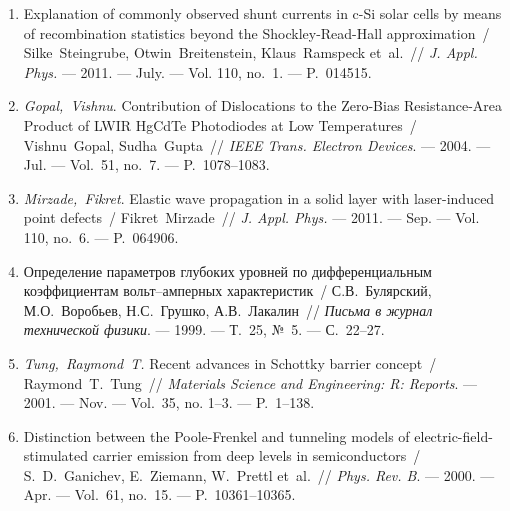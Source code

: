 \begin{center}
\textbf{\MakeUppercase{\fullbibtitle}}
\end{center}

\begin{enumerate}[label=\arabic*$^*$.,leftmargin=0em,itemindent=3em]
\item
Explanation of commonly observed shunt currents in c-Si solar cells by means of
  recombination statistics beyond the Shockley-Read-Hall approximation~/
  Silke~Steingrube, Otwin~Breitenstein, Klaus~Ramspeck et~al.~// \emph{J.
  Appl. Phys.} ---
  2011. --- July. ---
  Vol. 110, no.~1. ---
  P.~014515.



\item
\emph{Gopal,~Vishnu}. Contribution of Dislocations to the Zero-Bias
  Resistance-Area Product of {LWIR} {H}g{C}d{T}e Photodiodes at Low
  Temperatures~/ Vishnu~Gopal, Sudha~Gupta~// \emph{IEEE Trans. Electron
  Devices}. ---
  2004. --- Jul. ---
  Vol.~51, no.~7. ---
  P.~1078--1083.
  
\item
\emph{Mirzade,~Fikret}. Elastic wave propagation in a solid layer with
  laser-induced point defects~/ Fikret~Mirzade~// \emph{J. Appl. Phys.} ---
  2011. --- Sep. ---
  Vol. 110, no.~6. ---
  P.~064906.  

\item
Определение параметров глубоких уровней
  по дифференциальным коэффициентам
  вольт--амперных характеристик~/
  С.В.~Булярский, М.О.~Воробьев, Н.С.~Грушко,
  А.В.~Лакалин~// \emph{Письма в журнал
  технической физики}. ---
  1999. ---
  Т.~25, {№}~5. ---
  {С.}~22--27.

\item
\emph{Tung,~Raymond~T.} Recent advances in {S}chottky barrier concept~/
  Raymond~T.~Tung~// \emph{Materials Science and Engineering: R: Reports}.
  ---
  2001. --- Nov. ---
  Vol.~35, no. 1--3. ---
  P.~1--138.

\item
Distinction between the {P}oole-{F}renkel and tunneling models of
  electric-field-stimulated carrier emission from deep levels in
  semiconductors~/ S.~D.~Ganichev, E.~Ziemann, W.~Prettl et~al.~//
  \emph{Phys. Rev. B}. ---
  2000. --- Apr. ---
  Vol.~61, no.~15. ---
  P.~10361--10365.


\end{enumerate}
